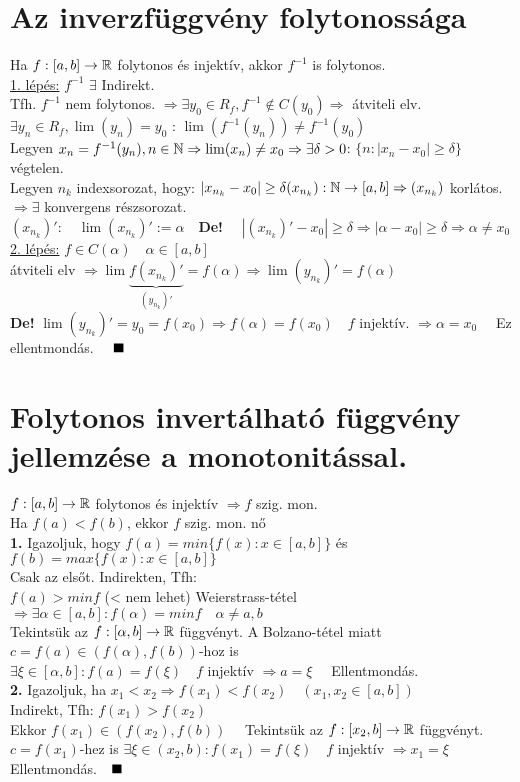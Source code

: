 \documentclass[a4paper,12pt]{article}
\begin{document}
\section{Az inverzfüggvény folytonossága}
\tetel Ha $f:[a,b]\to\mathbb{R}$ folytonos és injektív, akkor $f^{-1}$ is folytonos.\\[0.1cm]
\biz \underline{1. lépés:} $f^{-1}$  $\exists$ Indirekt.\\[0.1cm] Tfh. $f^{-1}$ nem
folytonos. $\Rightarrow\exists y_{0}\in R_f, f^{-1}\notin C(y_0)\Rightarrow$
átviteli elv.\\[0.1cm] $\exists y_n\in R_f,\lim(y_n)=y_0$ : $\lim(f^{-1}(y_n))\neq
f^{-1}(y_0)$\\[0.1cm] Legyen $x_n=f^{-1}(y_n),n\in\mathbb{N}\Rightarrow\lim(x_n)\neq
x_0\Rightarrow\exists\delta>0$: $\{n:|x_n-x_0|\geq\delta\}$ végtelen.\\[0.1cm]
Legyen $n_k$ indexsorozat, hogy: $|x_{n_k}-x_0|\geq\delta\\[0.1cm](x_{n_k}):
\mathbb{N}\to[a,b]\Rightarrow(x_{n_k})$ korlátos. $\Rightarrow\exists$ konvergens
részsorozat.\\[0.1cm] $(x_{n_k})':\quad\lim(x_{n_k})':=\alpha\quad$\textbf{De!}
$\quad|(x_{n_k})'-x_0|\geq\delta\Rightarrow|\alpha-x_0|\geq\delta\Rightarrow\alpha
\neq x_0$\\[0.1cm]\underline{2. lépés:} $f\in C(\alpha)\quad\alpha\in[a,b]$\\[0.1cm]
átviteli elv $\Rightarrow\lim\underbrace{f(x_{n_k})'}_{(y_{n_k})'}=
f(\alpha)\Rightarrow\lim(y_{n_k})'=f(\alpha)$\\[0.1cm]\textbf{De!}
$\lim(y_{n_k})'=y_0=f(x_0)\Rightarrow f(\alpha)=f(x_0)\quad f$ injektív.
$\Rightarrow\alpha=x_0\quad$ Ez ellentmondás. $\quad\blacksquare$
\newpage
\section{Folytonos invertálható függvény jellemzése a monotonitással.}
\tetel $f:[a,b]\to\mathbb{R}$ folytonos és injektív $\Rightarrow f$ szig. mon.\\[0.1cm]
\biz Ha $f(a)<f(b)$, ekkor $f$ szig. mon. nő\\[0.1cm] \textbf{1.} Igazoljuk, hogy
$f(a)=min\{f(x):x\in[a,b]\}$ és $f(b)=max\{f(x):x\in[a,b]\}$\\[0.1cm] Csak az
elsőt. Indirekten, Tfh:\\[0.1cm] $f(a)>min f$ (< nem lehet) Weierstrass-tétel
$\Rightarrow\exists\alpha\in[a,b]:f(\alpha)=min f\quad\alpha\neq a,b$\\[0.1cm]
Tekintsük az $f:[\alpha,b]\to\mathbb{R}$ függvényt. A Bolzano-tétel miatt $c=f(a)
\in(f(\alpha),f(b))$-hoz is\\[0.1cm] $\exists\xi\in[\alpha,b]:f(a)=f(\xi)\quad f$
injektív $\Rightarrow a=\xi\quad$ Ellentmondás.\\[0.1cm]\textbf{2.} Igazoljuk, ha
$x_1<x_2\Rightarrow f(x_1)<f(x_2)\quad(x_1,x_2\in[a,b])$\\[0.1cm]Indirekt, Tfh:
$f(x_1)>f(x_2)$\\[0.1cm]Ekkor $f(x_1)\in(f(x_2),f(b))\quad$ Tekintsük az $f:[x_2,b]
\to\mathbb{R}$ függvényt.\\[0.1cm]$c=f(x_1)$-hez is $\exists\xi\in(x_2,b):
f(x_1)=f(\xi)\quad f$ injektív $\Rightarrow x_1=\xi\quad$ Ellentmondás.$\quad\blacksquare$
\end{document}
